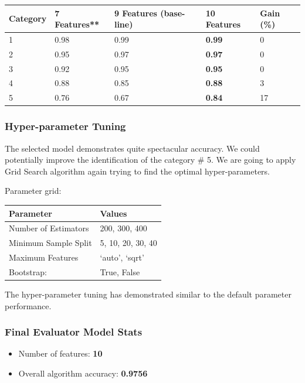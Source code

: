 \begin{longtable}[]{@{}lllll@{}}
\toprule
Category & 7 Features** & 9 Features (base-line) & \textbf{10 Features}
& Gain (\%)\tabularnewline
\midrule
\endhead
1 & 0.98 & 0.99 & \textbf{0.99} & 0\tabularnewline
2 & 0.95 & 0.97 & \textbf{0.97} & 0\tabularnewline
3 & 0.92 & 0.95 & \textbf{0.95} & 0\tabularnewline
4 & 0.88 & 0.85 & \textbf{0.88} & 3\tabularnewline
5 & 0.76 & 0.67 & \textbf{0.84} & 17\tabularnewline
\bottomrule
\end{longtable}

\hypertarget{hyper-parameter-tuning-1}{%
\subsubsection{Hyper-parameter Tuning}\label{hyper-parameter-tuning-1}}

The selected model demonstrates quite spectacular accuracy. We could
potentially improve the identification of the category \# 5. We are
going to apply Grid Search algorithm again trying to find the optimal
hyper-parameters.

Parameter grid:

\begin{longtable}[]{@{}ll@{}}
\toprule
Parameter & Values\tabularnewline
\midrule
\endhead
Number of Estimators & 200, 300, 400\tabularnewline
Minimum Sample Split & 5, 10, 20, 30, 40\tabularnewline
Maximum Features & `auto', `sqrt'\tabularnewline
Bootstrap: & True, False\tabularnewline
\bottomrule
\end{longtable}

The hyper-parameter tuning has demonstrated similar to the default
parameter performance.

\hypertarget{final-evaluator-model-stats}{%
\subsubsection{Final Evaluator Model
Stats}\label{final-evaluator-model-stats}}

\begin{itemize}
\tightlist
\item
  Number of features: \textbf{10}
\item
  Overall algorithm accuracy: \textbf{0.9756}
\end{itemize}

